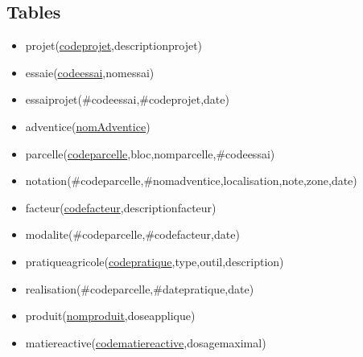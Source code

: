 \documentclass{article}
\begin{document}
\subsection{Tables}
\begin{itemize}
  \item projet(\underline{codeprojet},descriptionprojet)  
  \item essaie(\underline{codeessai},nomessai)
  \item essaiprojet(\#codeessai,\#codeprojet,date)
  \item adventice(\underline{nomAdventice}) 
  \item parcelle(\underline{codeparcelle},bloc,nomparcelle,\#codeessai)
  \item notation(\#codeparcelle,\#nomadventice,localisation,note,zone,date)
  \item facteur(\underline{codefacteur},descriptionfacteur)
  \item modalite(\#codeparcelle,\#codefacteur,date)
  \item pratiqueagricole(\underline{codepratique},type,outil,description)
  \item realisation(\#codeparcelle,\#datepratique,date)
  \item produit(\underline{nomproduit},doseapplique)
  \item matiereactive(\underline{codematiereactive},dosagemaximal)
\end{itemize}






\end{document}
